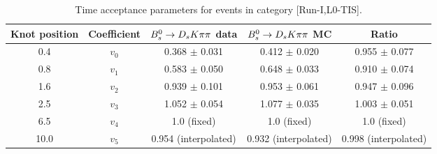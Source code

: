 \begin{table}[h]
\centering
\small
\caption{Time acceptance parameters for events in category [\textsf{Run-I},\textsf{L0-TIS}].}
\begin{tabular}{c c c c c}
\hline
\hline
Knot position & Coefficient & ${{B}^0_{s}}\rightarrow{\ensuremath{{D}_{s}}}{\ensuremath{K}}{\ensuremath{\pi}}{\ensuremath{\pi}}$ data & ${{B}^0_{s}}\rightarrow{\ensuremath{{D}_{s}}}{\ensuremath{K}}{\ensuremath{\pi}}{\ensuremath{\pi}}$ MC & Ratio \\
\hline
0.4 & $v_{0}$ & 0.368 $\pm$ 0.031 & 0.412 $\pm$ 0.020 & 0.955 $\pm$ 0.077\\
0.8 & $v_{1}$ & 0.583 $\pm$ 0.050 & 0.648 $\pm$ 0.033 & 0.910 $\pm$ 0.074\\
1.6 & $v_{2}$ & 0.939 $\pm$ 0.101 & 0.953 $\pm$ 0.061 & 0.947 $\pm$ 0.096\\
2.5 & $v_{3}$ & 1.052 $\pm$ 0.054 & 1.077 $\pm$ 0.035 & 1.003 $\pm$ 0.051\\
6.5 & $v_{4}$ &  1.0 (fixed) & 1.0 (fixed) & 1.0 (fixed)\\
10.0 & $v_{5}$ & 0.954 (interpolated) & 0.932 (interpolated) & 0.998 (interpolated) \\
\hline
\hline
\end{tabular}
\label{table:splines}
\end{table}
